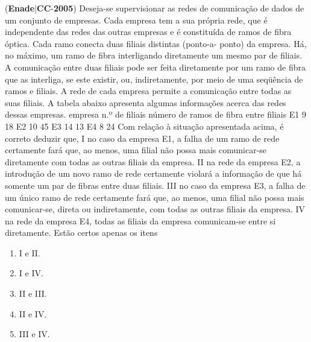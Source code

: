 \documentclass{exam}
\begin{document}
\begin{questions}
\begin{enumerate}[label=\alph*)]
	\end{enumerate}

\question (\textbf{Enade}$|$\textbf{CC}-\textbf{2005}) Deseja-se supervisionar as redes de comunicação
de dados de um conjunto de empresas. Cada empresa
tem a sua própria rede, que é independente das redes
das outras empresas e é constituída de ramos de fibra
óptica. Cada ramo conecta duas filiais distintas (ponto-a-
ponto) da empresa. Há, no máximo, um ramo de fibra
interligando diretamente um mesmo par de filiais.
A comunicação entre duas filiais pode ser feita
diretamente por um ramo de fibra que as interliga, se
este existir, ou, indiretamente, por meio de uma
seqüência de ramos e filiais. A rede de cada empresa
permite a comunicação entre todas as suas filiais.
A tabela abaixo apresenta algumas informações acerca
das redes dessas empresas.
empresa n.º de filiais
número de ramos
de fibra entre filiais
E1 9 18
E2 10 45
E3 14 13
E4 8 24
Com relação à situação apresentada acima, é correto deduzir
que,
I no caso da empresa E1, a falha de um ramo de rede
certamente fará que, ao menos, uma filial não possa mais
comunicar-se diretamente com todas as outras filiais da
empresa.
II na rede da empresa E2, a introdução de um novo ramo de
rede certamente violará a informação de que há somente
um par de fibras entre duas filiais.
III no caso da empresa E3, a falha de um único ramo de rede
certamente fará que, ao menos, uma filial não possa mais
comunicar-se, direta ou indiretamente, com todas as outras
filiais da empresa.
IV na rede da empresa E4, todas as filiais da empresa
comunicam-se entre si diretamente.
Estão certos apenas os itens
	\begin{enumerate}[label=\alph*)]
		\item  I e II. 
		\item  I e IV. 
		\item  II e III.
		\item  II e IV.
		\item  III e IV.

	\end{enumerate}


\end{questions}
\end{document}
